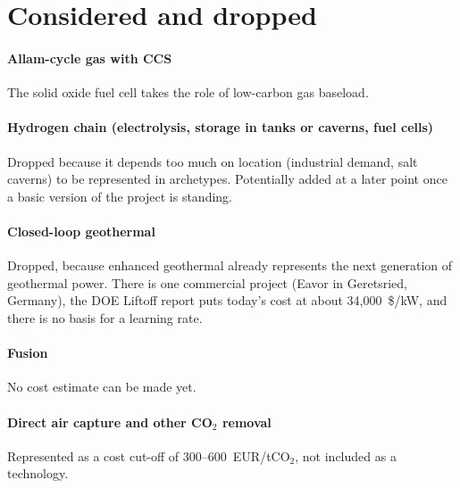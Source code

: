 \section{Considered and dropped}
\paragraph{Allam-cycle gas with CCS} 
The solid oxide fuel cell takes the role of low-carbon gas baseload.

\paragraph{Hydrogen chain (electrolysis, storage in tanks or caverns, fuel cells)}
Dropped because it depends too much on location (industrial demand, salt caverns) to be represented in archetypes.
Potentially added at a later point once a basic version of the project is standing.

\paragraph{Closed-loop geothermal} 
Dropped, because enhanced geothermal already represents the next generation of geothermal power.
There is one commercial project (Eavor in Geretsried, Germany), the DOE Liftoff report puts today's cost at about 34,000~\$/kW, and there is no basis for a learning rate.

\paragraph{Fusion}
No cost estimate can be made yet.

\paragraph{Direct air capture and other CO$_2$ removal}
Represented as a cost cut-off of 300--600~EUR/tCO$_2$, not included as a technology.
